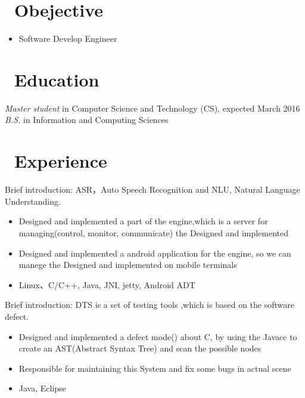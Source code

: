 \documentclass{resume}
\begin{document}


\section{\faSearch\ Obejective}
\begin{itemize}
  \item Software Develop Engineer
\end{itemize}

\section{\faGraduationCap\ Education}
\textit{Master student} in Computer Science and Technology (CS), expected March 2016
\textit{B.S.} in Information and Computing Sciences

\section{\faBriefcase\ Experience}
Brief introduction: ASR，Auto Speech Recognition and NLU, Natural Language Understanding.
\begin{itemize}
  \item Designed and implemented a part of the engine,which is a server for managing(control, monitor, communicate) the Designed and implemented
  \item Designed and implemented a android application for the engine, so we can manege the Designed and implemented on mobile terminals
  \item Linux、C/C++, Java, JNI, jetty, Android ADT
\end{itemize}

Brief introduction: DTS is a set of testing tools ,which is based on the software defect.
\begin{itemize}
  \item Designed and implemented a defect mode() about C, by using the Javacc to create an AST(Abstract Syntax Tree) and scan the possible nodes
  \item Responsible for maintaining this System and fix some bugs in actual scene
  \item Java, Eclipse
\end{itemize}
\end{document}
